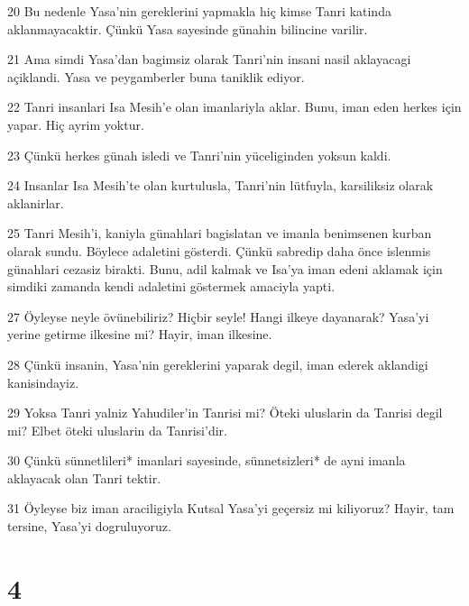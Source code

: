 \par 20 Bu nedenle Yasa'nin gereklerini yapmakla hiç kimse Tanri katinda aklanmayacaktir. Çünkü Yasa sayesinde günahin bilincine varilir.
\par 21 Ama simdi Yasa'dan bagimsiz olarak Tanri'nin insani nasil aklayacagi açiklandi. Yasa ve peygamberler buna taniklik ediyor.
\par 22 Tanri insanlari Isa Mesih'e olan imanlariyla aklar. Bunu, iman eden herkes için yapar. Hiç ayrim yoktur.
\par 23 Çünkü herkes günah isledi ve Tanri'nin yüceliginden yoksun kaldi.
\par 24 Insanlar Isa Mesih'te olan kurtulusla, Tanri'nin lütfuyla, karsiliksiz olarak aklanirlar.
\par 25 Tanri Mesih'i, kaniyla günahlari bagislatan ve imanla benimsenen kurban olarak sundu. Böylece adaletini gösterdi. Çünkü sabredip daha önce islenmis günahlari cezasiz birakti. Bunu, adil kalmak ve Isa'ya iman edeni aklamak için simdiki zamanda kendi adaletini göstermek amaciyla yapti.
\par 27 Öyleyse neyle övünebiliriz? Hiçbir seyle! Hangi ilkeye dayanarak? Yasa'yi yerine getirme ilkesine mi? Hayir, iman ilkesine.
\par 28 Çünkü insanin, Yasa'nin gereklerini yaparak degil, iman ederek aklandigi kanisindayiz.
\par 29 Yoksa Tanri yalniz Yahudiler'in Tanrisi mi? Öteki uluslarin da Tanrisi degil mi? Elbet öteki uluslarin da Tanrisi'dir.
\par 30 Çünkü sünnetlileri* imanlari sayesinde, sünnetsizleri* de ayni imanla aklayacak olan Tanri tektir.
\par 31 Öyleyse biz iman araciligiyla Kutsal Yasa'yi geçersiz mi kiliyoruz? Hayir, tam tersine, Yasa'yi dogruluyoruz.

\chapter{4}

